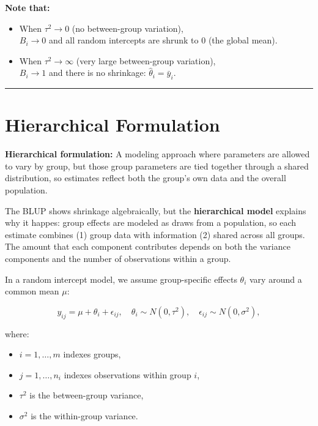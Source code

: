\documentclass[
  letterpaper,
  DIV=11,
  numbers=noendperiod]{scrreprt}
\providecommand{\tightlist}{%
  \setlength{\itemsep}{0pt}\setlength{\parskip}{0pt}}\usepackage{longtable,booktabs,array}
\begin{document}
\textbf{Note that:}

\begin{itemize}
\item
  When \(\tau^2 \to 0\) (no between-group variation),\\
  \(B_i \to 0\) and all random intercepts are shrunk to 0 (the global
  mean).
\item
  When \(\tau^2 \to \infty\) (very large between-group variation),\\
  \(B_i \to 1\) and there is no shrinkage:
  \(\hat{\theta}_i = \bar{y}_i\).
\end{itemize}

\begin{center}\rule{0.5\linewidth}{0.5pt}\end{center}

\hypertarget{hierarchical-formulation}{%
\section*{Hierarchical Formulation}\label{hierarchical-formulation}}


\textbf{Hierarchical formulation:} A modeling approach where parameters
are allowed to vary by group, but those group parameters are tied
together through a shared distribution, so estimates reflect both the
group's own data and the overall population.

The BLUP shows shrinkage algebraically, but the \textbf{hierarchical
model} explains why it happes: group effects are modeled as draws from a
population, so each estimate combines (1) group data with information
(2) shared across all groups. The amount that each component contributes
depends on both the variance components and the number of observations
within a group.

In a random intercept model, we assume group-specific effects
\(\theta_i\) vary around a common mean \(\mu\):

\[
  y_{ij} = \mu + \theta_i + \epsilon_{ij}, 
  \quad \theta_i \sim N(0, \tau^2), 
  \quad \epsilon_{ij} \sim N(0, \sigma^2),
\]

where:

\begin{itemize}
\tightlist
\item
  \(i = 1, \ldots, m\) indexes groups,
\item
  \(j = 1, \ldots, n_i\) indexes observations within group \(i\),
\item
  \(\tau^2\) is the between-group variance,
\item
  \(\sigma^2\) is the within-group variance.
\end{itemize}
\end{document}
